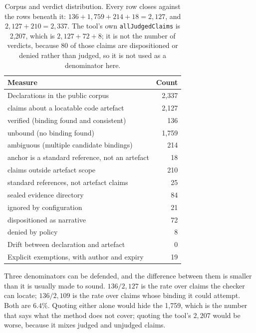 \begin{table}[t]
\centering
\small
\begin{tabular}{@{}lr@{}}
\toprule
Measure & Count \\
\midrule
Declarations in the public corpus                     & 2{,}337 \\
\quad claims about a locatable code artefact          & 2{,}127 \\
\qquad verified (binding found and consistent)        &   136 \\
\qquad unbound (no binding found)                     & 1{,}759 \\
\qquad ambiguous (multiple candidate bindings)        &   214 \\
\qquad anchor is a standard reference, not an artefact &    18 \\
\quad claims outside artefact scope                   &   210 \\
\qquad standard references, not artefact claims       &    25 \\
\qquad sealed evidence directory                      &    84 \\
\qquad ignored by configuration                       &    21 \\
\qquad dispositioned as narrative                     &    72 \\
\qquad denied by policy                               &     8 \\
\midrule
Drift between declaration and artefact               &     0 \\
Explicit exemptions, with author and expiry          &    19 \\
\bottomrule
\end{tabular}
\caption{Corpus and verdict distribution. Every row closes against the rows
beneath it: $136 + 1{,}759 + 214 + 18 = 2{,}127$, and $2{,}127 + 210 = 2{,}337$.
The tool's own \texttt{allJudgedClaims} is 2{,}207, which is $2{,}127 + 72 + 8$;
it is not the number of verdicts, because 80 of those claims are dispositioned or
denied rather than judged, so it is not used as a denominator here.}
\label{tab:verdicts}
\end{table}

Three denominators can be defended, and the difference between them is smaller
than it is usually made to sound. $136/2{,}127$ is the rate over claims the
checker can locate; $136/2{,}109$ is the rate over claims whose binding it could
attempt. Both are $6.4\%$. Quoting either alone would hide the 1{,}759, which is
the number that says what the method does not cover; quoting the tool's
$2{,}207$ would be worse, because it mixes judged and unjudged claims.

